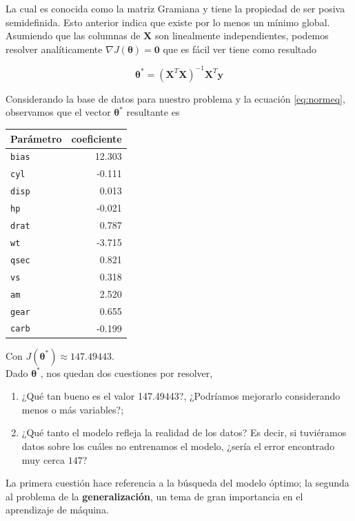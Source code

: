 \documentclass[11pt]{article}
\begin{document}
La cual es conocida como la matriz Gramiana y tiene la propiedad de ser posiva semidefinida. Esto anterior indica que existe por lo menos un mínimo global.  Asumiendo que las columnas de $\bm X$ son linealmente independientes, podemos resolver analíticamente $\nabla J(\bm\theta) = \bm 0$ que es fácil ver tiene como resultado

\begin{equation}\label{eq:normeq}
  \bm\theta^* = \left(\bm X^T\bm X\right)^{-1} \bm{X}^T\bm y
\end{equation}

Considerando la base de datos para nuestro problema y la ecuación \ref{eq:normeq}, observamos que el vector $\bm\theta^*$ resultante es

\begin{center}
\begin{tabular}{lr}
Parámetro & coeficiente\\
\midrule
\texttt{bias} & 12.303\\
 \texttt{cyl} & -0.111 \\
\texttt{disp} & 0.013 \\ 
  \texttt{hp} & -0.021 \\
\texttt{drat} & 0.787 \\
  \texttt{wt} & -3.715\\
\texttt{qsec} & 0.821\\
  \texttt{vs} & 0.318\\
  \texttt{am} & 2.520\\
\texttt{gear} & 0.655\\
\texttt{carb} & -0.199\\
\end{tabular}
\end{center}

Con $J(\bm\theta^*) \approx 147.49443$.\\

Dado $\bm\theta^*$, nos quedan dos cuestiones por resolver,
\begin{enumerate}
	\item ¿Qué tan bueno es el valor 147.49443?, ¿Podríamos mejorarlo considerando menos o más variables?;
	\item ¿Qué tanto el modelo refleja la realidad de los datos? Es decir, si tuviéramos datos sobre los cuáles no entrenamos el modelo, ¿sería el error encontrado muy cerca $147$?
\end{enumerate}

La primera cuestión hace referencia a la búsqueda del modelo óptimo; la segunda al problema de la \textbf{generalización}, un tema de gran importancia en el aprendizaje de máquina.
\end{document}

